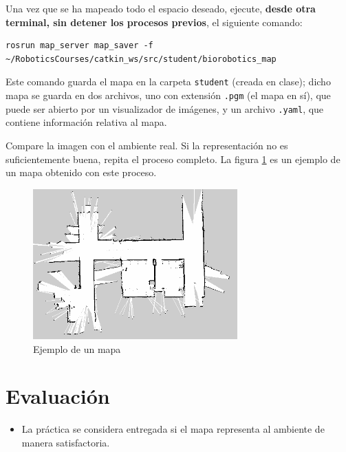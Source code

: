 \documentclass[letterpaper,12pt]{article}
\begin{document}
Una vez que se ha mapeado todo el espacio deseado, ejecute, \textbf{desde otra terminal, sin detener los procesos previos}, el siguiente comando:
\begin{verbatim}
rosrun map_server map_saver -f ~/RoboticsCourses/catkin_ws/src/student/biorobotics_map
\end{verbatim}
Este comando guarda el mapa en la carpeta \texttt{student} (creada en clase); dicho mapa se guarda en dos archivos, uno con extensión \texttt{.pgm} (el mapa en sí), que puede ser abierto por un visualizador de imágenes, y un archivo \texttt{.yaml}, que contiene información relativa al mapa. 

Compare la imagen con el ambiente real. Si la representación no es suficientemente buena, repita el proceso completo. La figura \ref{fig:mapa} es un ejemplo de un mapa obtenido con este proceso. 

\begin{figure}
\centering
\includegraphics[width=0.7\textwidth]{Figures/map.png}
\caption{Ejemplo de un mapa}
\label{fig:mapa}
\end{figure}


\section{Evaluación}
\begin{itemize}
\item La práctica se considera entregada si el mapa representa al ambiente de manera satisfactoria. 
\end{itemize}
\end{document}

